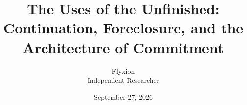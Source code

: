 \documentclass[11pt]{article}
\title{The Uses of the Unfinished:\\[0.3em]
\large Continuation, Foreclosure, and the Architecture of Commitment}
\author{Flyxion\\ \small Independent Researcher}
\date{September 27, 2026}
\theoremstyle{definition}
\theoremstyle{remark}
\begin{document}
\maketitle



\newpage
\tableofcontents
\bigskip






\end{document}
